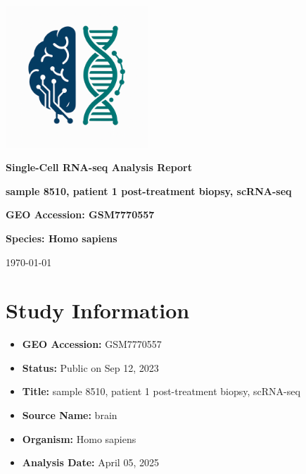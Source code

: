 \documentclass[12pt]{article}
\begin{document}
\begin{titlepage}
    \centering
    \vspace*{2cm}

    \includegraphics[width=0.4\textwidth]{scagentic_logo.png}
    \vspace{1cm}

    \Huge\textbf{Single-Cell RNA-seq Analysis Report}
    \vspace{1cm}

    \Large\textbf{sample 8510, patient 1 post-treatment biopsy, scRNA-seq}
    \vspace{0.5cm}

    \Large\textbf{GEO Accession: GSM7770557}
    \vspace{0.5cm}

    \Large\textbf{Species: Homo sapiens}
    \vspace{0.5cm}
    \vspace{1cm}

    \large\today
\end{titlepage}

\tableofcontents
\newpage

\section{Study Information}
\begin{itemize}
    \item \textbf{GEO Accession:} GSM7770557
    \item \textbf{Status:} Public on Sep 12, 2023
    \item \textbf{Title:} sample 8510, patient 1 post-treatment biopsy, scRNA-seq
    \item \textbf{Source Name:} brain
    \item \textbf{Organism:} Homo sapiens
    \item \textbf{Analysis Date:} {April 05, 2025}
\end{itemize}
\end{document}
